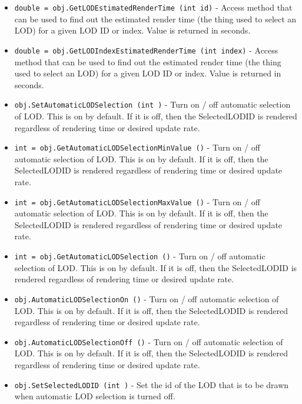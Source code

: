\begin{itemize}
\item  \verb|double = obj.GetLODEstimatedRenderTime (int id)| -  Access method that can be used to find out the estimated render time
 (the thing used to select an LOD) for a given LOD ID or index. 
 Value is returned in seconds.

\item  \verb|double = obj.GetLODIndexEstimatedRenderTime (int index)| -  Access method that can be used to find out the estimated render time
 (the thing used to select an LOD) for a given LOD ID or index. 
 Value is returned in seconds.

\item  \verb|obj.SetAutomaticLODSelection (int )| -  Turn on / off automatic selection of LOD. 
 This is on by default. If it is off, then the SelectedLODID is 
 rendered regardless of rendering time or desired update rate. 

\item  \verb|int = obj.GetAutomaticLODSelectionMinValue ()| -  Turn on / off automatic selection of LOD. 
 This is on by default. If it is off, then the SelectedLODID is 
 rendered regardless of rendering time or desired update rate. 

\item  \verb|int = obj.GetAutomaticLODSelectionMaxValue ()| -  Turn on / off automatic selection of LOD. 
 This is on by default. If it is off, then the SelectedLODID is 
 rendered regardless of rendering time or desired update rate. 

\item  \verb|int = obj.GetAutomaticLODSelection ()| -  Turn on / off automatic selection of LOD. 
 This is on by default. If it is off, then the SelectedLODID is 
 rendered regardless of rendering time or desired update rate. 

\item  \verb|obj.AutomaticLODSelectionOn ()| -  Turn on / off automatic selection of LOD. 
 This is on by default. If it is off, then the SelectedLODID is 
 rendered regardless of rendering time or desired update rate. 

\item  \verb|obj.AutomaticLODSelectionOff ()| -  Turn on / off automatic selection of LOD. 
 This is on by default. If it is off, then the SelectedLODID is 
 rendered regardless of rendering time or desired update rate. 

\item  \verb|obj.SetSelectedLODID (int )| -  Set the id of the LOD that is to be drawn when automatic LOD selection
 is turned off.


\end{itemize}
